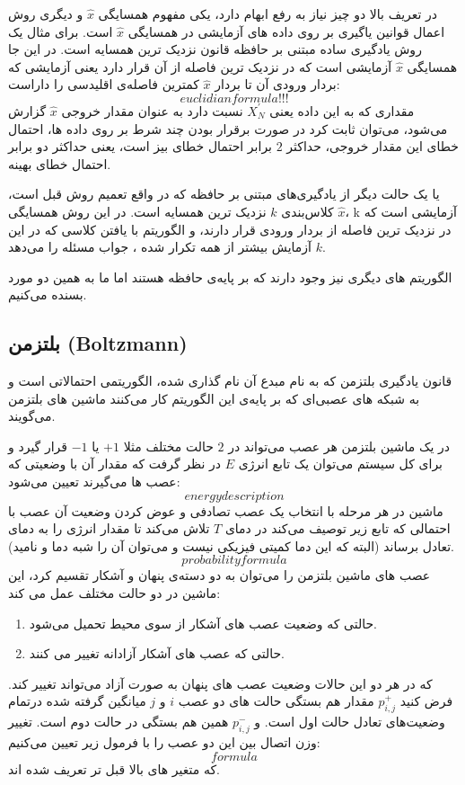 \documentclass[11pt,a4paper,twocolumn]{article}
\begin{document}
در تعریف بالا دو چیز نیاز به رفع ابهام دارد، یکی مفهوم همسایگی
$\widehat x$
و دیگری روش اعمال قوانین یاگیری بر روی داده های آزمایشی در همسایگی
$\widehat x$
است. برای مثال یک روش یادگیری ساده مبتنی بر حافظه
قانون نزدیک ترین همسایه
است. در این جا همسایگی
$\widehat x$
آزمایشی است که در نزدیک ترین فاصله از آن قرار دارد یعنی آزمایشی که بردار ورودی آن تا بردار
$\widehat x$
کمترین فاصله‌ی اقلیدسی را داراست:
$$euclidian formula!!!$$
مقداری که به این داده یعنی
$X_N^{'}$
نسبت دارد به عنوان مقدار خروجی
$\widehat x$
گزارش می‌شود، می‌توان ثابت کرد در صورت برقرار بودن چند شرط بر روی داده ها، احتمال خطای این مقدار خروجی، حداکثر $2$ برابر احتمال خطای بیز است، یعنی حداکثر دو برابر احتمال خطای بهینه.

یا یک حالت دیگر از یادگیری‌های مبتنی بر حافظه که در واقع تعمیم روش قبل است، کلاس‌بندی $k$ نزدیک ترین همسایه است. در این روش همسایگی $\widehat x$، k آزمایشی است که در نزدیک ترین فاصله از بردار ورودی قرار دارند، و الگوریتم با یافتن کلاسی که در این $k$ آزمایش بیشتر از همه تکرار شده ، جواب مسئله را می‌دهد.


الگوریتم های دیگری نیز وجود دارند که بر پایه‌ی حافظه هستند اما ما به همین دو مورد بسنده می‌کنیم.

\subsection{بلتزمن (Boltzmann)}
قانون یادگیری بلتزمن که به نام مبدع آن نام گذاری شده، الگوریتمی احتمالاتی است و به شبکه های عصبی‌ای که بر پایه‌ی این الگوریتم کار می‌کنند ماشین های بلتزمن می‌گویند.

در یک ماشین بلتزمن هر عصب می‌تواند در $2$ حالت مختلف مثلا $+1$ یا $-1$ قرار گیرد و برای کل سیستم می‌توان یک تابع انرژی $E$ در نظر گرفت که مقدار آن با وضعیتی که عصب ها می‌گیرند تعیین می‌شود:
$$energy description$$
ماشین در هر مرحله با انتخاب یک عصب تصادفی و عوض کردن وضعیت آن عصب با احتمالی که تابع زیر توصیف می‌کند در دمای $T$ تلاش می‌کند تا مقدار انرژی را به دمای تعادل برساند (البته که این دما کمیتی فیزیکی  نیست و می‌توان آن را شبه دما و نامید).
$$probability formula$$
عصب های ماشین بلتزمن را می‌توان به دو دسته‌ی پنهان و آشکار تقسیم کرد، این ماشین در دو حالت مختلف عمل می کند:
\begin{enumerate}
\item
حالتی  که وضعیت عصب های آشکار از سوی محیط تحمیل می‌شود.
\item
حالتی که عصب های آشکار آزادانه تغییر می کنند.
\end{enumerate}
که در هر دو این حالات وضعیت عصب های پنهان به صورت آزاد می‌تواند تغییر کند. فرض کنید $p_{i,j}^{+}$ مقدار هم بستگی حالت های دو عصب $i$ و $j$  میانگین گرفته شده درتمام وضعیت‌های تعادل حالت اول است. و $p_{i,j}^{-}$ همین هم بستگی در حالت دوم است. تغییر وزن اتصال بین این دو عصب را با فرمول زیر تعیین می‌کنیم:
$$formula$$
که متغیر های بالا قبل تر تعریف شده اند. 
\end{document}
